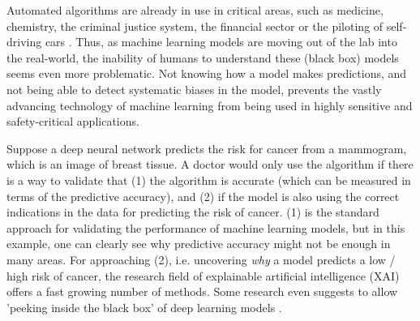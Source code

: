 Automated algorithms are already in use in critical areas, such as medicine, chemistry, the criminal justice system, the financial sector or the piloting of self-driving cars \cite{chouldechova2017fair, elshawi2019interpretability, whitmore2016mapping}. %
Thus, as machine learning models are moving out of the lab into the real-world, the inability of humans to understand these (black box) models seems even more problematic. Not knowing how a model makes predictions, and not being able to detect systematic biases in the model, prevents the vastly advancing technology of machine learning from being used in highly sensitive and safety-critical applications.  

Suppose a deep neural network predicts the risk for cancer from a mammogram, which is an image of breast tissue. A doctor would only use the algorithm if there is a way to validate that (1) the algorithm is accurate (which can be measured in terms of the predictive accuracy), and (2) if the model is also using the correct indications in the data for predicting the risk of cancer. (1) is the standard approach for validating the performance of machine learning models, but in this example, one can clearly see why predictive accuracy might not be enough in many areas. For approaching (2), i.e. uncovering \textit{why} a model predicts a low / high risk of cancer, the research field of explainable artificial intelligence (XAI) offers a fast growing number of methods. Some research even suggests to allow 'peeking inside the black box' of deep learning models \cite{adadi2018peeking}.  


